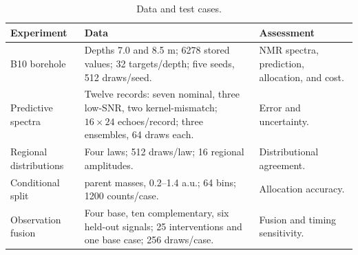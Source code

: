 \begin{table}[t]
\centering
\caption{Data and test cases.}\label{tab:public-data}
\small
\begin{tabularx}{\textwidth}{@{}>{\raggedright\arraybackslash}p{}>{\raggedright\arraybackslash}p{}>{\raggedright\arraybackslash}X@{}}
\toprule
Experiment & Data & Assessment\\
\midrule
B10 borehole & Depths 7.0 and 8.5 m; 6278 stored values; 32 targets/depth; five seeds, 512 draws/seed. & NMR spectra, prediction, allocation, and cost.\\
Predictive spectra & Twelve records: seven nominal, three low-SNR, two kernel-mismatch; $16\times24$ echoes/record; three ensembles, 64 draws each. & Error and uncertainty.\\
Regional distributions & Four laws; 512 draws/law; 16 regional amplitudes. & Distributional agreement.\\
Conditional split & 32 parent masses, 0.2--1.4 a.u.; 64 bins; 1200 counts/case. & Allocation accuracy.\\
Observation fusion & Four base, ten complementary, six held-out signals; 25 interventions and one base case; 256 draws/case. & Fusion and timing sensitivity.\\
\bottomrule
\end{tabularx}
\end{table}
